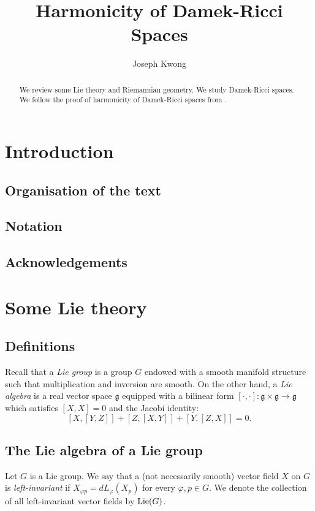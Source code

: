 \documentclass{amsart}
\title{Harmonicity of Damek-Ricci Spaces}
\author{Joseph Kwong}
\newcommand{\lie}{\text{\normalfont Lie}}
\newcommand{\g}{\mathfrak g}
\theoremstyle{plain}
\theoremstyle{definition}
\theoremstyle{remark}
\begin{document}
	\maketitle
	\begin{abstract}
		We review some Lie theory and Riemannian geometry. We study Damek-Ricci spaces. We follow the proof of harmonicity of Damek-Ricci spaces from \cite{tricerri}.
	\end{abstract}
	\setcounter{tocdepth}{2}
	\tableofcontents
	
	
	\section{Introduction}
	\subsection{Organisation of the text}
	\subsection{Notation}
	\subsection{Acknowledgements}
	
	
	
	\section{Some Lie theory} 
	
	\subsection{Definitions}
	Recall that a \emph{Lie group} is a group $G$ endowed with a smooth manifold structure such that multiplication and inversion are smooth.
	On the other hand, a \emph{Lie algebra} is a real vector space $\g$ equipped with a bilinear form $[\cdot,\cdot]: \g \times \g \rightarrow \g$ which satisfies $[X,X] = 0$ and the Jacobi identity:
	$$[X,[Y,Z]] + [Z,[X,Y]] + [Y,[Z,X]] = 0.$$
	
	\subsection{The Lie algebra of a Lie group}
	Let $G$ is a Lie group. We say that a (not necessarily smooth) vector field $X$ on $G$  is \emph{left-invariant} if $X_{\varphi p} = dL_\varphi(X_p)$ for every $\varphi,p \in G$. We denote the collection of all left-invariant vector fields by $\lie(G)$. 
	
\end{document}
